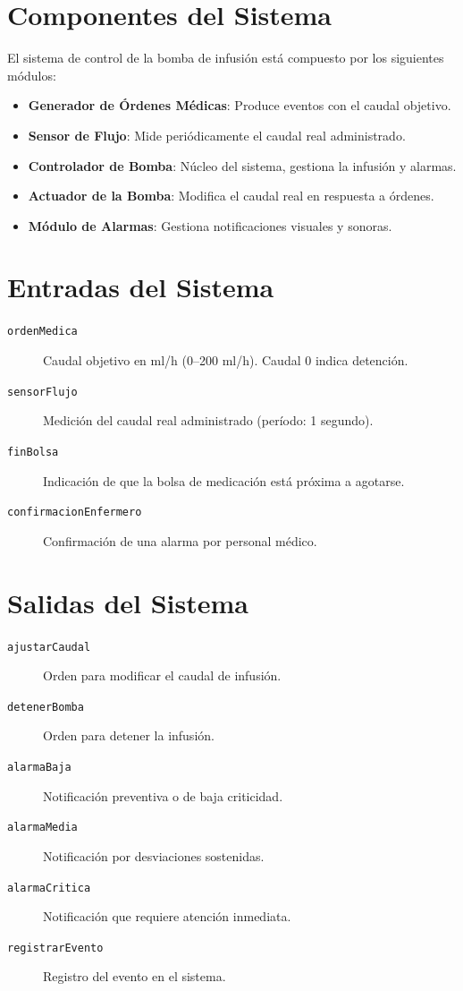 \documentclass[12pt,a4paper,oneside]{report}
\begin{document}
\section{Componentes del Sistema}

El sistema de control de la bomba de infusión está compuesto por los siguientes módulos:

\begin{itemize}
    \item \textbf{Generador de Órdenes Médicas}: Produce eventos con el caudal objetivo.
    \item \textbf{Sensor de Flujo}: Mide periódicamente el caudal real administrado.
    \item \textbf{Controlador de Bomba}: Núcleo del sistema, gestiona la infusión y alarmas.
    \item \textbf{Actuador de la Bomba}: Modifica el caudal real en respuesta a órdenes.
    \item \textbf{Módulo de Alarmas}: Gestiona notificaciones visuales y sonoras.
\end{itemize}

\section{Entradas del Sistema}

\begin{description}
    \item[\texttt{ordenMedica}] Caudal objetivo en ml/h (0--200 ml/h). Caudal 0 indica detención.
    \item[\texttt{sensorFlujo}] Medición del caudal real administrado (período: 1 segundo).
    \item[\texttt{finBolsa}] Indicación de que la bolsa de medicación está próxima a agotarse.
    \item[\texttt{confirmacionEnfermero}] Confirmación de una alarma por personal médico.
\end{description}

\section{Salidas del Sistema}

\begin{description}
    \item[\texttt{ajustarCaudal}] Orden para modificar el caudal de infusión.
    \item[\texttt{detenerBomba}] Orden para detener la infusión.
    \item[\texttt{alarmaBaja}] Notificación preventiva o de baja criticidad.
    \item[\texttt{alarmaMedia}] Notificación por desviaciones sostenidas.
    \item[\texttt{alarmaCritica}] Notificación que requiere atención inmediata.
    \item[\texttt{registrarEvento}] Registro del evento en el sistema.
\end{description}
\end{document}
